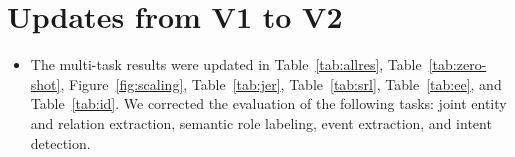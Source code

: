 \section{Updates from V1 to V2}

\begin{itemize}
    \item The \method multi-task results were updated in Table~\ref{tab:allres}, Table~\ref{tab:zero-shot}, Figure~\ref{fig:scaling}, Table~\ref{tab:jer}, Table~\ref{tab:srl}, Table~\ref{tab:ee}, and Table~\ref{tab:id}. We corrected the evaluation of the following tasks: joint entity and relation extraction, semantic role labeling, event extraction, and intent detection.
\end{itemize}

%
 